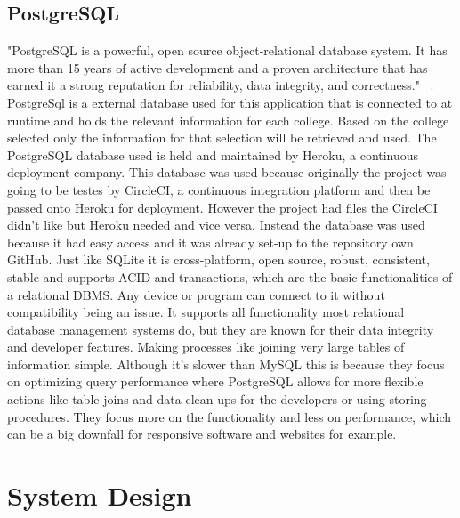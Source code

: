 \section{PostgreSQL}
"PostgreSQL is a powerful, open source object-relational database system. It has more than 15 years of active development and a proven architecture that has earned it a strong reputation for reliability, data integrity, and correctness." ~\cite{postgres}. PostgreSql is a external database used for this application that is connected to at runtime and holds the relevant information for each college. Based on the college selected only the information for that selection will be retrieved and used. The PostgreSQL database used is held and maintained by Heroku, a continuous deployment company. This database was used because originally the project was going to be testes by CircleCI, a continuous integration platform and then be passed onto Heroku for deployment. However the project had files the CircleCI didn't like but Heroku needed and vice versa. Instead the database was used because it had easy access and it was already set-up to the repository own GitHub. Just like SQLite it is cross-platform, open source, robust, consistent, stable and supports ACID and transactions, which are the basic functionalities of a relational DBMS. Any device or program can connect to it without compatibility being an issue. It supports all functionality most relational database management systems do, but they are known for their data integrity and developer features. Making processes like joining very large tables of information simple. Although it's slower than MySQL this is because they focus on optimizing query performance where PostgreSQL allows for more flexible actions like table joins and data clean-ups for the developers or using storing procedures. They focus more on the functionality and less on performance, which can be a big downfall for responsive software and websites for example.

\chapter{System Design}
